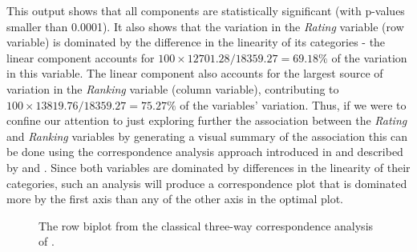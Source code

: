 This output shows that all components are statistically significant (with p-values smaller than 0.0001). It also shows that the variation in the {\it Rating} variable (row variable) is dominated by the difference in the linearity of its categories - the linear component accounts for $100 \times 12701.28/18359.27 = 69.18\%$ of the variation in this variable. The linear component also accounts for the largest source of variation in the {\it Ranking} variable (column variable), contributing to $100 \times 13819.76/18359.27 = 75.27\%$ of the variables' variation. Thus, if we were to confine our attention to just exploring further the association between the {\it Rating} and {\it Ranking} variables by generating a visual summary of the association this can be done using the correspondence analysis approach introduced in \cite{beh97} and described by \citet[Chap. 6]{behlom14} and \citet[Chap. 4]{behlom21b}. Since both variables are dominated by differences in the linearity of their categories, such an analysis will produce a correspondence plot that is dominated more by the first  axis than any of the other axis in the optimal plot. 

\begin{figure}[h]
	\begin{center}
\caption{\label{row-biplot-ca3} The row biplot from the classical three-way correspondence analysis of .}
	\end{center}
\end{figure}
